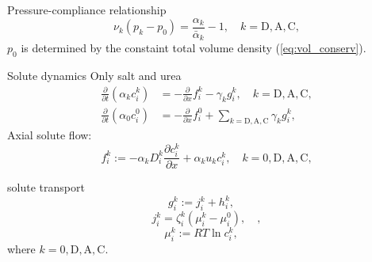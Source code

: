 \documentclass{beamer}
\begin{document}
\begin{frame}{Pressure-compliance relationship}
    \begin{equation}
        \nu_k(p_k - p_0) = \frac{\alpha_k}{\bar{\alpha}_k} - 1,\quad k=\mathrm{D},\mathrm{A},\mathrm{C},
    \end{equation}
    $p_0$ is determined by the constaint total volume density (\ref{eq:vol_conserv}).
\end{frame}

\begin{frame}{Solute dynamics}
    Only salt and urea
    \begin{align}\label{eq:solute_dynamics}
        \frac{\partial}{\partial t}\left( \alpha_k c_i^k \right)&=-\frac{\partial}{\partial x} f_i^k - \gamma_kg_i^k,\quad k=\mathrm{D},\mathrm{A},\mathrm{C},\\
        \frac{\partial}{\partial t}\left( \alpha_0 c_i^0 \right)&=-\frac{\partial}{\partial x} f_i^0 + \sum_{k=\mathrm{D},\mathrm{A},\mathrm{C}} \gamma_k g_i^k,
    \end{align}
    \pause
    Axial solute flow:
    \begin{equation}
        f_i^k := -\alpha_kD_i^k\frac{\partial c_i^k}{\partial x}+\alpha_ku_kc_i^k,\quad k=0,\mathrm{D},\mathrm{A},\mathrm{C},
    \end{equation}
\end{frame}

\begin{frame}{solute transport}
    \begin{equation}
        g_i^k := j_i^k+h_i^k,\quad 
    \end{equation}
    \begin{equation}
        j_i^k = \zeta_i^k\left( \mu_i^k - \mu_i^0 \right),\quad ,
    \end{equation}
    \begin{equation}
        \mu_i^k:= RT\ln c_i^k,\quad 
    \end{equation}
    where $k=0,\mathrm{D},\mathrm{A},\mathrm{C}$.
\end{frame}
\end{document}
